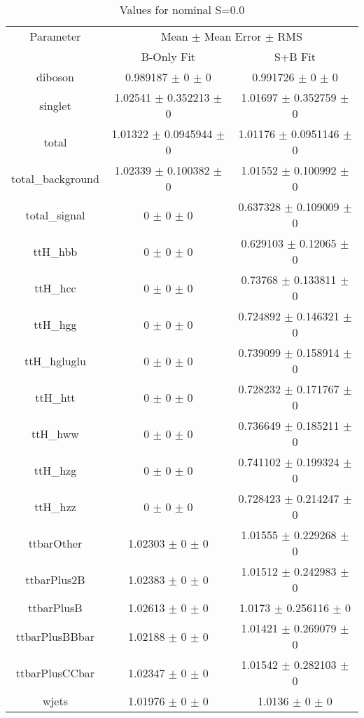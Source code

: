 \begin{table}
\centering
\caption{Values for nominal S=0.0}
\begin{tabular}{ccc}
\toprule
Parameter & \multicolumn{2}{c}{Mean $\pm$ Mean Error $\pm$ RMS}\\
 & B-Only Fit & S+B Fit\\
\midrule
diboson & \num{0.989187} $\pm$ \num{0} $\pm$ \num{0} & \num{0.991726} $\pm$ \num{0} $\pm$ \num{0}\\
singlet & \num{1.02541} $\pm$ \num{0.352213} $\pm$ \num{0} & \num{1.01697} $\pm$ \num{0.352759} $\pm$ \num{0}\\
total & \num{1.01322} $\pm$ \num{0.0945944} $\pm$ \num{0} & \num{1.01176} $\pm$ \num{0.0951146} $\pm$ \num{0}\\
total\_background & \num{1.02339} $\pm$ \num{0.100382} $\pm$ \num{0} & \num{1.01552} $\pm$ \num{0.100992} $\pm$ \num{0}\\
total\_signal & \num{0} $\pm$ \num{0} $\pm$ \num{0} & \num{0.637328} $\pm$ \num{0.109009} $\pm$ \num{0}\\
ttH\_hbb & \num{0} $\pm$ \num{0} $\pm$ \num{0} & \num{0.629103} $\pm$ \num{0.12065} $\pm$ \num{0}\\
ttH\_hcc & \num{0} $\pm$ \num{0} $\pm$ \num{0} & \num{0.73768} $\pm$ \num{0.133811} $\pm$ \num{0}\\
ttH\_hgg & \num{0} $\pm$ \num{0} $\pm$ \num{0} & \num{0.724892} $\pm$ \num{0.146321} $\pm$ \num{0}\\
ttH\_hgluglu & \num{0} $\pm$ \num{0} $\pm$ \num{0} & \num{0.739099} $\pm$ \num{0.158914} $\pm$ \num{0}\\
ttH\_htt & \num{0} $\pm$ \num{0} $\pm$ \num{0} & \num{0.728232} $\pm$ \num{0.171767} $\pm$ \num{0}\\
ttH\_hww & \num{0} $\pm$ \num{0} $\pm$ \num{0} & \num{0.736649} $\pm$ \num{0.185211} $\pm$ \num{0}\\
ttH\_hzg & \num{0} $\pm$ \num{0} $\pm$ \num{0} & \num{0.741102} $\pm$ \num{0.199324} $\pm$ \num{0}\\
ttH\_hzz & \num{0} $\pm$ \num{0} $\pm$ \num{0} & \num{0.728423} $\pm$ \num{0.214247} $\pm$ \num{0}\\
ttbarOther & \num{1.02303} $\pm$ \num{0} $\pm$ \num{0} & \num{1.01555} $\pm$ \num{0.229268} $\pm$ \num{0}\\
ttbarPlus2B & \num{1.02383} $\pm$ \num{0} $\pm$ \num{0} & \num{1.01512} $\pm$ \num{0.242983} $\pm$ \num{0}\\
ttbarPlusB & \num{1.02613} $\pm$ \num{0} $\pm$ \num{0} & \num{1.0173} $\pm$ \num{0.256116} $\pm$ \num{0}\\
ttbarPlusBBbar & \num{1.02188} $\pm$ \num{0} $\pm$ \num{0} & \num{1.01421} $\pm$ \num{0.269079} $\pm$ \num{0}\\
ttbarPlusCCbar & \num{1.02347} $\pm$ \num{0} $\pm$ \num{0} & \num{1.01542} $\pm$ \num{0.282103} $\pm$ \num{0}\\
wjets & \num{1.01976} $\pm$ \num{0} $\pm$ \num{0} & \num{1.0136} $\pm$ \num{0} $\pm$ \num{0}\\
\bottomrule
\end{tabular}
\end{table}